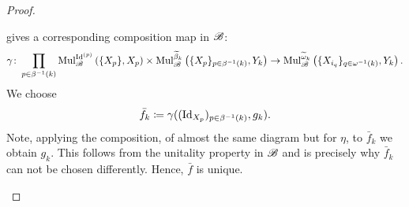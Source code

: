\begin{proof}
\begin{enumerate}
\begin{center}
        \end{center}
        gives a corresponding composition map in $\mathscr{B}$:
        $$
            \gamma \colon \prod_{p \in {\beta^{-1}(k)}} \operatorname{Mul}_{\mathscr{B}}^{\operatorname{Id}^{(p)}}\left(\{X_{p}\}, X_{p}\right)\times \operatorname{Mul}_{\mathscr{B}}^{\widetilde{\beta}_k}\left(\{X_p\}_{p\in \beta^{-1}(k)}, Y_k\right) \to \operatorname{Mul}_{\mathscr{B}}^{\widetilde{\omega}_k} \left(\{X_{i_q}\}_{q \in \omega^{-1}(k)}, Y_k\right).
        $$
        We choose
        \[
            \bar{f}_k \coloneqq \gamma((\operatorname{Id}_{X_p})_{p \in {\beta^{-1}(k)}}, g_k).
        \]
        Note, applying the composition, of almost the same diagram but for
        $\eta$, to $\bar{f}_k$ we obtain $g_k$. This follows from the unitality
        property in $\mathscr{B}$ and is precisely why $\bar{f}_k$ can not be chosen
        differently. Hence, $\bar{f}$ is unique. 
        

\end{enumerate}
\end{proof}
